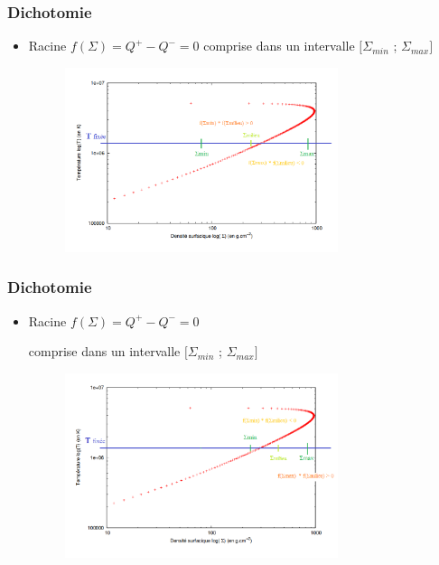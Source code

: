 \documentclass[french]{beamer}
\begin{document}
   
    




\begin{frame}
\frametitle{Dichotomie}

   \begin{itemize}
      \item Racine $f(\Sigma) = Q^+ - Q^- = 0$ comprise dans un intervalle $[\Sigma_{min}$ ; $\Sigma_{max}]$
      \\
      \begin{figure}[htb!]
         \includegraphics[width=8cm]{figures/dicho_1.png}
      \end{figure}
   \end{itemize}
\end{frame}


\begin{frame}
\frametitle{Dichotomie}

   \begin{itemize}
      \item Racine $f(\Sigma) = Q^+ - Q^- = 0$ 
      
      comprise dans un intervalle $[\Sigma_{min}$ ; $\Sigma_{max}]$
      \\
      \begin{figure}[htb!]
         \includegraphics[width=8cm]{figures/dicho_2.png}
      \end{figure}
   \end{itemize}
\end{frame}
\end{document}
